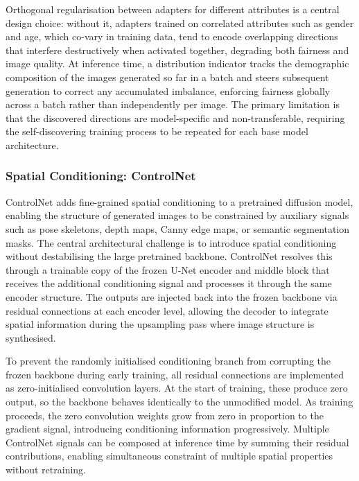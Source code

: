 Orthogonal regularisation between adapters for different attributes is a central design choice: without it, adapters trained on correlated attributes such as gender and age, which co-vary in training data, tend to encode overlapping directions that interfere destructively when activated together, degrading both fairness and image quality. At inference time, a distribution indicator tracks the demographic composition of the images generated so far in a batch and steers subsequent generation to correct any accumulated imbalance, enforcing fairness globally across a batch rather than independently per image. The primary limitation is that the discovered directions are model-specific and non-transferable, requiring the self-discovering training process to be repeated for each base model architecture.

\subsubsection*{Spatial Conditioning: ControlNet}
\label{subsubsec:controlnet}

ControlNet \cite{LZhang_2023_ControlNet} adds fine-grained spatial conditioning to a pretrained diffusion model, enabling the structure of generated images to be constrained by auxiliary signals such as pose skeletons, depth maps, Canny edge maps, or semantic segmentation masks. The central architectural challenge is to introduce spatial conditioning without destabilising the large pretrained backbone. ControlNet resolves this through a trainable copy of the frozen U-Net encoder and middle block that receives the additional conditioning signal and processes it through the same encoder structure. The outputs are injected back into the frozen backbone via residual connections at each encoder level, allowing the decoder to integrate spatial information during the upsampling pass where image structure is synthesised.

To prevent the randomly initialised conditioning branch from corrupting the frozen backbone during early training, all residual connections are implemented as zero-initialised convolution layers. At the start of training, these produce zero output, so the backbone behaves identically to the unmodified model. As training proceeds, the zero convolution weights grow from zero in proportion to the gradient signal, introducing conditioning information progressively. Multiple ControlNet signals can be composed at inference time by summing their residual contributions, enabling simultaneous constraint of multiple spatial properties without retraining.

